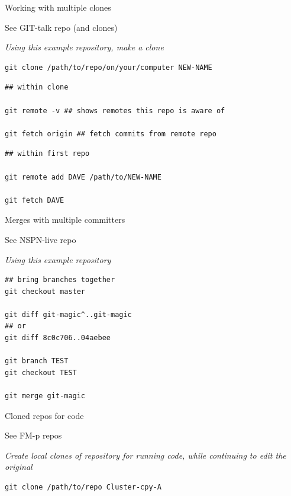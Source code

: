 \begin{frame}[fragile]{Working with multiple clones}
  
  See GIT-talk repo (and clones)

  \vspace{1em}

  \itshape\color{gray}
  Using this example repository, make a clone
\begin{verbatim}
git clone /path/to/repo/on/your/computer NEW-NAME
\end{verbatim}


\begin{verbatim}
## within clone

git remote -v ## shows remotes this repo is aware of

git fetch origin ## fetch commits from remote repo
\end{verbatim}


\begin{verbatim}
## within first repo

git remote add DAVE /path/to/NEW-NAME

git fetch DAVE
\end{verbatim}



\end{frame}



\begin{frame}[fragile]{Merges with multiple committers}
  
  See NSPN-live repo

  \itshape\color{gray}
  Using this example repository
\begin{verbatim}
## bring branches together
git checkout master

git diff git-magic^..git-magic
## or
git diff 8c0c706..04aebee

git branch TEST
git checkout TEST

git merge git-magic
\end{verbatim}


\end{frame}

\begin{frame}[fragile]{Cloned repos for code}
  
  See FM-p repos


  \itshape\color{gray}
  Create local clones of repository for running code, while continuing
  to edit the original
\begin{verbatim}
git clone /path/to/repo Cluster-cpy-A
\end{verbatim}


\end{frame}


